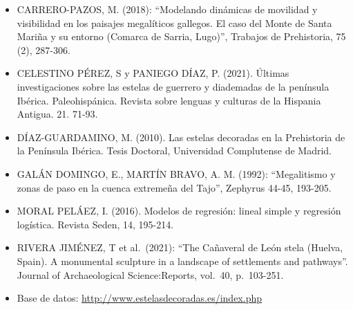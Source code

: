 \documentclass[
]{article}
\providecommand{\tightlist}{%
  \setlength{\itemsep}{0pt}\setlength{\parskip}{0pt}}
\begin{document}
\begin{itemize}
\tightlist
\item
  CARRERO-PAZOS, M. (2018): ``Modelando dinámicas de movilidad y
  visibilidad en los paisajes megalíticos gallegos. El caso del Monte de
  Santa Mariña y su entorno (Comarca de Sarria, Lugo)'', Trabajos de
  Prehistoria, 75 (2), 287-306.
\item
  CELESTINO PÉREZ, S y PANIEGO DÍAZ, P. (2021). Últimas investigaciones
  sobre las estelas de guerrero y diademadas de la península Ibérica.
  Paleohispánica. Revista sobre lenguas y culturas de la Hispania
  Antigua. 21. 71-93.
\item
  DÍAZ-GUARDAMINO, M. (2010). Las estelas decoradas en la Prehistoria de
  la Península Ibérica. Tesis Doctoral, Universidad Complutense de
  Madrid.
\item
  GALÁN DOMINGO, E., MARTÍN BRAVO, A. M. (1992): ``Megalitismo y zonas
  de paso en la cuenca extremeña del Tajo'', Zephyrus 44-45, 193-205.
\item
  MORAL PELÁEZ, I. (2016). Modelos de regresión: lineal simple y
  regresión logística. Revista Seden, 14, 195-214.
\item
  RIVERA JIMÉNEZ, T et al.~(2021): ``The Cañaveral de León stela
  (Huelva, Spain). A monumental sculpture in a landscape of settlements
  and pathways''. Journal of Archaeological Science:Reports, vol.~40,
  p.~103-251.
\item
  Base de datos: \url{http://www.estelasdecoradas.es/index.php}
\end{itemize}
\end{document}
